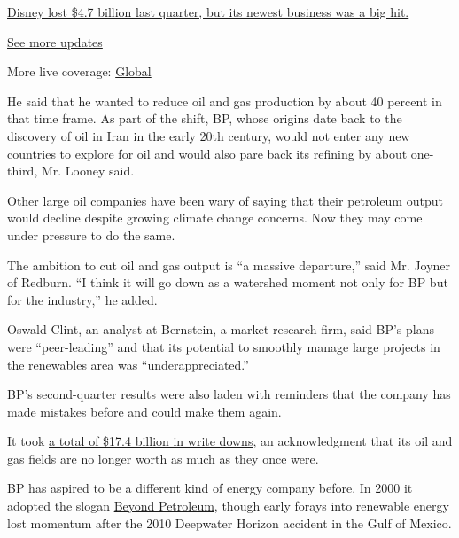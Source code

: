 \href{https://www.nytimes.com/live/2020/08/04/business/stock-market-today-coronavirus?action=click\&pgtype=Article\&state=default\&region=MAIN_CONTENT_1\&context=storylines_live_updates\#disney-lost-4-7-billion-last-quarter-but-its-newest-business-was-a-big-hit}{Disney
lost \$4.7 billion last quarter, but its newest business was a big hit.}

\href{https://www.nytimes.com/live/2020/08/04/business/stock-market-today-coronavirus?action=click\&pgtype=Article\&state=default\&region=MAIN_CONTENT_1\&context=storylines_live_updates}{See
more updates}

More live coverage:
\href{https://www.nytimes.com/2020/08/04/world/coronavirus-cases.html?action=click\&pgtype=Article\&state=default\&region=MAIN_CONTENT_1\&context=storylines_live_updates}{Global}

He said that he wanted to reduce oil and gas production by about 40
percent in that time frame. As part of the shift, BP, whose origins date
back to the discovery of oil in Iran in the early 20th century, would
not enter any new countries to explore for oil and would also pare back
its refining by about one-third, Mr. Looney said.

Other large oil companies have been wary of saying that their petroleum
output would decline despite growing climate change concerns. Now they
may come under pressure to do the same.

The ambition to cut oil and gas output is ``a massive departure,'' said
Mr. Joyner of Redburn. ``I think it will go down as a watershed moment
not only for BP but for the industry,'' he added.

Oswald Clint, an analyst at Bernstein, a market research firm, said BP's
plans were ``peer-leading'' and that its potential to smoothly manage
large projects in the renewables area was ``underappreciated.''

BP's second-quarter results were also laden with reminders that the
company has made mistakes before and could make them again.

It took
\href{https://www.nytimes.com/2020/06/15/business/energy-environment/bp-oil-gas-write-down.html}{a
total of \$17.4 billion in write downs}, an acknowledgment that its oil
and gas fields are no longer worth as much as they once were.

BP has aspired to be a different kind of energy company before. In 2000
it adopted the slogan
\href{https://www.nytimes.com/2002/12/08/magazine/how-green-is-bp.html}{Beyond
Petroleum}, though early forays into renewable energy lost momentum
after the 2010 Deepwater Horizon accident in the Gulf of Mexico.

